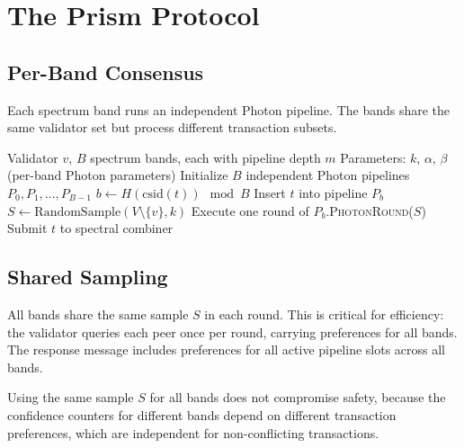 \section{The Prism Protocol}

\label{sec:protocol}

\subsection{Per-Band Consensus}

Each spectrum band runs an independent Photon pipeline. The bands share the same
validator set but process different transaction subsets.

\begin{algorithm}[H]
\caption{Prism Protocol --- Multi-Spectrum Parallel Consensus}
\label{alg:prism-core}
\begin{algorithmic}[1]
\Require Validator $v$, $B$ spectrum bands, each with pipeline depth $m$
\Require Parameters: $k$, $\alpha$, $\beta$ (per-band Photon parameters)
\State Initialize $B$ independent Photon pipelines $P_0, P_1, \ldots, P_{B-1}$
\Loop
    \State {}
        \State $b \gets H(\text{csid}(t)) \mod B$
        \State Insert $t$ into pipeline $P_b$
    \EndFor
    \State {}
    \State $S \gets \text{RandomSample}(V \setminus \{v\}, k)$
        \State Execute one round of $P_b$.\textsc{PhotonRound}($S$)
    \EndFor
    \State {}
            \State Submit $t$ to spectral combiner
        \EndFor
    \EndFor
\EndLoop
\end{algorithmic}
\end{algorithm}

\subsection{Shared Sampling}

All bands share the same sample $S$ in each round. This is critical for efficiency:
the validator queries each peer once per round, carrying preferences for all bands.
The response message includes preferences for all active pipeline slots across all bands.

\begin{lemma}
\label{lem:shared-sample}
Using the same sample $S$ for all bands does not compromise safety, because the
confidence counters for different bands depend on different transaction preferences,
which are independent for non-conflicting transactions.
\end{lemma}

